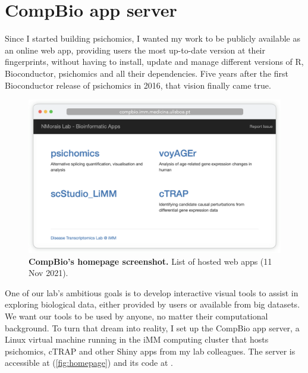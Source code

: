 \chapter{CompBio app server}
\label{chap:app-server}

Since I started building psichomics, I wanted my work to be publicly available as an online web app, providing users the most up-to-date version at their fingerprints, without having to install, update and manage different versions of R, Bioconductor, psichomics and all their dependencies.
Five years after the first Bioconductor release of psichomics in 2016, that vision finally came true.

\begin{figure}[!b]
  \includegraphics[width=.89\textwidth]{images/app-server/homepage}
  \centering
  \caption[Screenshot of CompBio's homepage]{\textbf{CompBio's homepage screenshot.} List of hosted web apps (11 Nov 2021).}
  \label{fig:homepage}
\end{figure}

One of our lab's ambitious goals is to develop interactive visual tools to assist in exploring biological data, either provided by users or available from big datasets. We want our tools to be used by anyone, no matter their computational background. To turn that dream into reality, I set up the CompBio app server, a Linux virtual machine running in the iMM computing cluster that hosts psichomics, cTRAP and other Shiny apps from my lab colleagues. The server is accessible at  (\autoref{fig:homepage}) and its code at .


